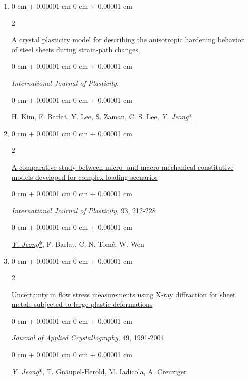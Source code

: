 \documentclass[10pt, letterpaper]{article}
\newenvironment{onecolentry}{
    \begin{adjustwidth}{
        0 cm + 0.00001 cm
    }{
        0 cm + 0.00001 cm
    }
}{
    \end{adjustwidth}
} %
\newenvironment{twocolentry}[2][]{
    \onecolentry
    \def\secondColumn{#2}
    \setcolumnwidth{\fill, 4.5 cm}
    \begin{paracol}{2}
}{
    \switchcolumn \raggedleft \secondColumn
    \end{paracol}
    \endonecolentry
} %
\begin{document}
\begin{enumerate}
        \item
        \begin{twocolentry}{2018}
            \href{https://doi.org/10.1016/j.ijplas.2018.07.010}{A crystal plasticity model for describing the anisotropic hardening behavior of steel
            sheets during strain‑path changes }
        \end{twocolentry}
        \begin{onecolentry}
            {\it International Journal of Plasticity},
        \end{onecolentry}
        \begin{onecolentry}
            H. Kim, F. Barlat, Y. Lee, S. Zaman, C. S. Lee, {\underline{\textit{Y. Jeong}*}}
        \end{onecolentry}
        \vspace{0.10 cm}


        \item
        \begin{twocolentry}{2017}
            \href{http://dx.doi.org/10.1016/j.ijplas.2016.07.015}{A comparative study between micro‑ and macro‑mechanical constitutive models developed for complex loading scenarios }
        \end{twocolentry}
        \begin{onecolentry}
            {\it International Journal of Plasticity}, 93, 212‑228
        \end{onecolentry}
        \begin{onecolentry}
            {\underline{\textit{Y. Jeong}*}}, F. Barlat, C. N. Tomé, W. Wen
        \end{onecolentry}
        \vspace{0.10 cm}


        \item
        \begin{twocolentry}{2016}
            \href{https://doi.org/10.1107/S1600576716013662}{Uncertainty in flow stress measurements using X‑ray diffraction for sheet metals subjected to large plastic deformations}
        \end{twocolentry}
        \begin{onecolentry}
            {\it Journal of Applied Crystallography}, 49, 1991‑2004
        \end{onecolentry}
        \begin{onecolentry}
            {\underline{\textit{Y. Jeong}*}}, T. Gnäupel‑Herold, M. Iadicola, A. Creuziger
        \end{onecolentry}
        \vspace{0.10 cm}



\end{enumerate}
\end{document}
